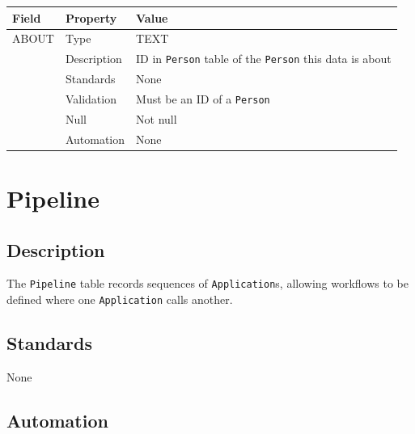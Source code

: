 \documentclass[
]{article}
\newcounter{none} %
\begin{document}
{\def\LTcaptype{none} %
\begin{longtable}[]{@{}
  >{\raggedright\arraybackslash}p{}
  >{\raggedright\arraybackslash}p{}
  >{\raggedright\arraybackslash}p{}@{}}
\toprule\noalign{}
\begin{minipage}[b]{\linewidth}\raggedright
Field
\end{minipage} & \begin{minipage}[b]{\linewidth}\raggedright
Property
\end{minipage} & \begin{minipage}[b]{\linewidth}\raggedright
Value
\end{minipage} \\
\midrule\noalign{}
\endhead
\bottomrule\noalign{}
\endlastfoot
ABOUT & Type & TEXT \\
& Description & ID in \texttt{Person} table of the \texttt{Person} this
data is about \\
& Standards & None \\
& Validation & Must be an ID of a \texttt{Person} \\
& Null & Not null \\
& Automation & None \\
\end{longtable}
}

\section{Pipeline}\label{pipeline}

\subsection{Description}\label{description-22}

The \texttt{Pipeline} table records sequences of \texttt{Application}s,
allowing workflows to be defined where one \texttt{Application} calls
another.

\subsection{Standards}\label{standards-24}

None

\subsection{Automation}\label{automation-24}
\end{document}
